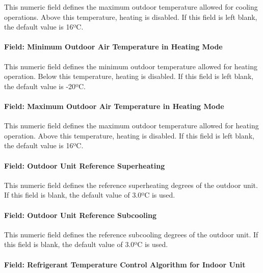 This numeric field defines the maximum outdoor temperature allowed for cooling operations. Above this temperature, heating is disabled. If this field is left blank, the default value is 16ºC.

\paragraph{Field: Minimum Outdoor Air Temperature in Heating Mode}\label{field-minimum-outdoor-air-temperature-in-heating-mode}

This numeric field defines the minimum outdoor temperature allowed for heating operation. Below this temperature, heating is disabled. If this field is left blank, the default value is -20ºC.

\paragraph{Field: Maximum Outdoor Air Temperature in Heating Mode}\label{field-maximum-outdoor-air-temperature-in-heating-mode}

This numeric field defines the maximum outdoor temperature allowed for heating operation. Above this temperature, heating is disabled. If this field is left blank, the default value is 16ºC.

\paragraph{Field: Outdoor Unit Reference Superheating}\label{field-outdoor-unit-reference-superheating}

This numeric field defines the reference superheating degrees of the outdoor unit. If this field is blank, the default value of 3.0ºC is used.

\paragraph{Field: Outdoor Unit Reference Subcooling}\label{field-outdoor-unit-reference-subcooling}

This numeric field defines the reference subcooling degrees of the outdoor unit. If this field is blank, the default value of 3.0ºC is used.

\paragraph{Field: Refrigerant Temperature Control Algorithm for Indoor Unit}\label{field-refrigerant-temperature-control-algorithm-for-indoor-unit}

